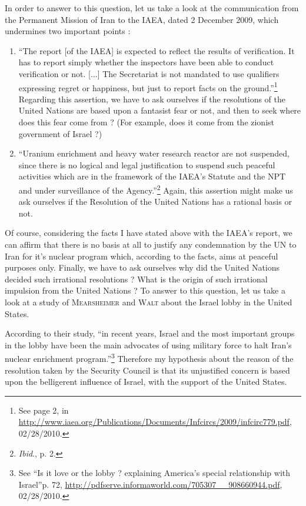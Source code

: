 \documentclass[10pt,a4paper]{scrartcl} %
\begin{document}
In order to answer to this question, let us take a look at the communication from the Permanent Mission of Iran to the IAEA, dated 2 December 2009, which undermines two important points : 
\begin{enumerate}
\item
\textquotedblleft The report [of the IAEA] is expected to reflect the results of verification. It has to report simply whether the inspectors have been able to conduct verification or not. [...] The Secretariat is not mandated to use qualifiers expressing regret or happiness, but just to report facts on the ground.\textquotedblright\footnote{See page 2, in \url{http://www.iaea.org/Publications/Documents/Infcircs/2009/infcirc779.pdf}, 02/28/2010.} Regarding this assertion, we have to ask ourselves if the resolutions of the United Nations are based upon a fantasist fear or not, and then to seek where does this fear come from ? (For example, does it come from the zionist government of Israel ?)
\item
\textquotedblleft Uranium enrichment and heavy water research reactor are not suspended, since there is no logical and legal justification to suspend such peaceful activities which are in the framework of the IAEA's Statute and the NPT and under surveillance of the Agency.\textquotedblright\footnote{\emph{Ibid}., p. 2.} Again, this assertion might make us ask ourselves if the Resolution of the United Nations has a rational basis or not.
\end{enumerate}

Of course, considering the facts I have stated above with the IAEA's report, we can affirm that there is no basis at all to justify any condemnation by the UN to Iran for it's nuclear program which, according to the facts, aims at peaceful purposes only. Finally, we have to ask ourselves why did the United Nations decided such irrational resolutions ? What is the origin of such irrational impulsion from the United Nations ? To answer to this question, let us take a look at a study of \textsc{Mearsheimer} and \textsc{Walt} about the Israel lobby in the United States.

According to their study, \textquotedblleft in recent years, Israel and the most important groups in the lobby have been the main advocates of using military force to halt Iran's nuclear enrichment program.\textquotedblright\footnote{See \textquotedblleft Is it love or the lobby ? explaining America's special relationship with Israel\textquotedblright p. 72, \url{http://pdfserve.informaworld.com/705307__908660944.pdf}, 02/28/2010.} Therefore my hypothesis about the reason of the resolution taken by the Security Council is that its unjustified concern is based upon the belligerent influence of Israel, with the support of the United States.
\end{document}
